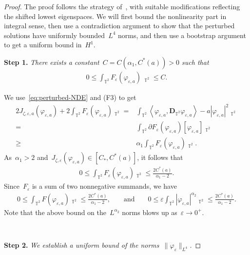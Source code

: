 \documentclass[10pt,a4paper]{amsart}
\newcommand{\T}{\mathbb{T}}
\newcommand{\dd}{\mathop{}\!\mathrm{d}}
\newcommand{\eps}{\varepsilon}
\newcommand{\pD}{\mathbf{D}}
\newcommand{\Abracket}[1]{\left<#1\right>} %
\DeclareMathOperator{\dv}{\dd{vol}}
\begin{document}
\begin{proof}
    The proof follows the strategy of~\cite{WZ2026Stationary}, with suitable modifications reflecting the shifted lowest eigenspaces. 
    We will first bound the nonlinearity part in integral sense, then use a contradiction argument to show that the perturbed solutions have uniformly bounded~$L^4$ norms, and then use a bootstrap argument to get a uniform bound in~$H^1$. 

    \noindent\textbf{Step 1.} \emph{There exists a constant~$C=C(\alpha_1, C^*(a))>0$ such that
    \begin{align}
        0\leq \int_{\T^2} F_\eps(\varphi_{\eps,a})\, \dv_{\T^2}\leq C.
    \end{align}
    }


    We use~\eqref{eq:perturbed-NDE} and (F3) to get
    \begin{align}
        2J_{\zeta,\eps,a}(\varphi_{\eps,a}) + 2\int_{\T^2} F_\eps(\varphi_{\eps,a})\dv_{\T^2}
        =&\int_{\T^2} \Abracket{\varphi_{\eps,a},\pD_{\T^2}\varphi_{\eps,a}}-a|\varphi_{\eps,a}|^2\dv_{\T^2} \\
        =&\int_{\T^2} \partial F_\eps(\varphi_{\eps,a})[\varphi_{\eps,a}]\dv_{\T^2} \\
        \geq& \alpha_1\int_{\T^2} F_\eps(\varphi_{\eps,a}) \dv_{\T^2}.
    \end{align}
    As~$\alpha_1>2$ and~$J_{\zeta,\eps}(\varphi_{\eps,a})\in [C_*, C^*(a)]$, it follows that
    \begin{align}
        0\leq \int_{\T^2} F_\eps(\varphi_{\eps,a})\dv_{\T^2} \leq \frac{2C^*(a)}{\alpha_1-2}.
    \end{align}
    Since~$F_\eps$ is a sum of two nonnegative summands, we have 
    \begin{align}\label{eq:uniform estimate for perturbation}
    0\leq \int_{\T^2} F(\varphi_{\eps,a})\dv_{\T^2}\leq \frac{2C^*(a)}{\alpha_1-2}, & & 
    \mbox{ and } & & 
    0\leq \eps\int_{\T^2} |\varphi_{\eps,a}|^{\alpha_2}\dv_{\T^2}\leq \frac{2C^*(a)}{\alpha_1-2}.
    \end{align}
    Note that the above bound on the~$L^{\alpha_2}$ norms blows up as~$\eps\to0^+$.

    \


\noindent\textbf{Step 2.} \emph{We establish a uniform bound of the norms~$\|\varphi_\eps\|_{L^4}$.} 


\end{proof}
\end{document}
